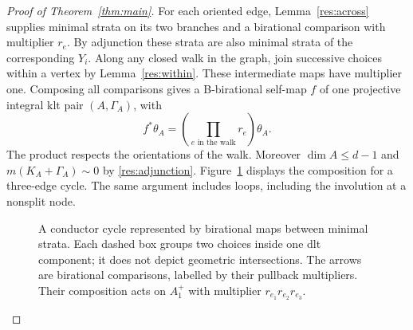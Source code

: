 \begin{proof}[Proof of Theorem~\ref{thm:main}]
 For each oriented edge, Lemma~\ref{res:across} supplies minimal
 strata on its two branches and a birational comparison with
 multiplier $r_e$.  By adjunction these strata are also minimal
 strata of the corresponding $Y_i$.  Along any closed walk in the
 graph, join successive choices within a vertex by
 Lemma~\ref{res:within}.  These intermediate maps have multiplier
 one.  Composing all comparisons gives a B-birational self-map $f$
 of one projective integral klt pair $(A,\Gamma_A)$, with
 \begin{equation}\label{res:cycle}
  f^*\theta_A=\left(\prod_{e\text{ in the walk}}r_e\right)\theta_A.
 \end{equation}
 The product respects the orientations of the walk.  Moreover
 $\dim A\le d-1$ and $m(K_A+\Gamma_A)\sim0$ by
 \eqref{res:adjunction}.  Figure~\ref{res:figure} displays the
 composition for a three-edge cycle.  The same argument includes
 loops, including the involution at a nonsplit node.

 \begin{figure}[tb]
 \centering
 \caption{A conductor cycle represented by birational maps between
 minimal strata.  Each dashed box groups two choices inside one dlt
 component; it does not depict geometric intersections.  The arrows
 are birational comparisons, labelled by their pullback multipliers.
 Their composition acts on $A_1^+$ with multiplier
 $r_{e_1}r_{e_2}r_{e_3}$.}
 \label{res:figure}
 \end{figure}


\end{proof}
